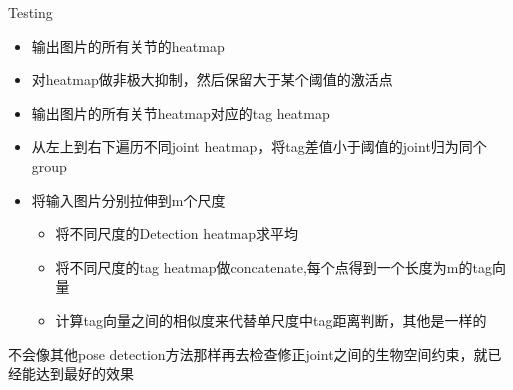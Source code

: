 \documentclass{ctexbeamer}
\begin{document}
    \begin{frame}{Testing}
      \begin{itemize}
          
          \item 输出图片的所有关节的heatmap
          \item 对heatmap做非极大抑制，然后保留大于某个阈值的激活点
          \item 输出图片的所有关节heatmap对应的tag heatmap
          \item 从左上到右下遍历不同joint heatmap，将tag差值小于阈值的joint归为同个group
          \item 将输入图片分别拉伸到m个尺度
          \begin{itemize}
            \item 将不同尺度的Detection heatmap求平均
            \item 将不同尺度的tag heatmap做concatenate,每个点得到一个长度为m的tag向量
            \item 计算tag向量之间的相似度来代替单尺度中tag距离判断，其他是一样的
        \end{itemize} 
      \end{itemize}
      \begin{block}{不会像其他pose detection方法那样再去检查修正joint之间的生物空间约束，就已经能达到最好的效果}
      \end{block}
    \vskip 1cm
    \end{frame}    
    
\end{document}
